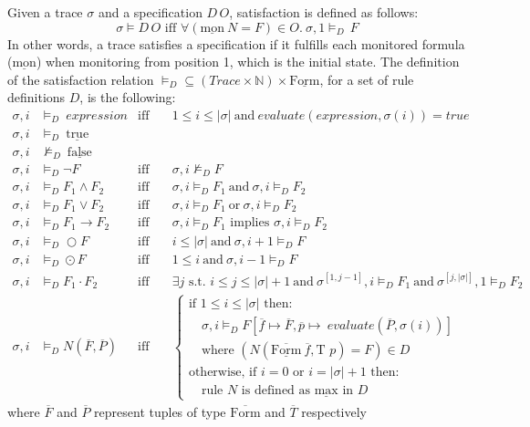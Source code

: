 \documentclass[english]{article}
\begin{document}
Given a trace $\sigma$ and a specification $D \, O$, satisfaction is defined as follows:
\[
\sigma \models D \, O \text{ iff } \forall (\underline{\text{mon}}\ N = F) \in O.\ \sigma ,1 \models_D \, F
\]
In other words, a trace satisfies a specification if it fulfills each monitored formula ($\underline{\text{mon}}$) when monitoring from position 1, which is the initial state. The definition of the satisfaction relation $\models_D \subseteq (Trace \times \mathbb{N}) \times \underline{\text{Form}}$, for a set of rule definitions $D$, is the following:
\begin{align*}
    \sigma, i &\models_D\ expression &\text{iff} \quad &1 \leq i \leq |\sigma|\ \text{and}\ evaluate(expression, \sigma(i)) = true \\
    \sigma, i &\models_D\ \underline{\text{true}} \\
    \sigma, i &\not\models_D\ \underline{\text{false}} \\
    \sigma, i &\models_D \neg F &\text{iff} \quad &\sigma, i \not\models_D F \\
    \sigma, i &\models_D F_1 \land F_2 &\text{iff} \quad &\sigma, i \models_D F_1\ \text{and}\ \sigma, i \models_D F_2 \\
    \sigma, i &\models_D F_1 \lor F_2 &\text{iff} \quad &\sigma, i \models_D F_1\ \text{or}\ \sigma, i \models_D F_2 \\
    \sigma, i &\models_D F_1 \rightarrow F_2 &\text{iff} \quad &\sigma, i \models_D F_1 \text{ implies } \sigma, i \models_D F_2 \\
    \sigma, i &\models_D \bigcirc F &\text{iff} \quad &i \leq |\sigma|\ \text{and}\ \sigma, i+1 \models_D F \\
    \sigma, i &\models_D \odot F &\text{iff} \quad &1 \leq i\ \text{and}\ \sigma, i-1 \models_D F \\
    \sigma, i &\models_D F_1 \cdot F_2 &\text{iff} \quad &\exists j \text{ s.t. } i \leq j \leq |\sigma|+1\ \text{and}\ \sigma^{[1, j-1]}, i \models_D F_1\ \text{and}\ \sigma^{[j,|\sigma|]}, 1 \models_D F_2 \\
    \sigma, i &\models_D N(\overline{F}, \overline{P}) &\text{iff} 
    &\begin{cases}
    \text{if } 1 \leq i \leq |\sigma| \text{ then:} \\
    \quad \sigma, i \models_D F[ \overline{f} \mapsto \overline{F}, \overline{p} \mapsto\ evaluate(\overline{P}, \sigma(i))] \\
    \quad \text{where } (N(\underline{\overline{\text{Form}}}\ \overline{f}, \text{T } p) = F) \in D \\
    \text{otherwise, if } i = 0 \text{ or } i = |\sigma|+1 \text{ then:} \\
    \quad \text{rule } N \text{ is defined as }\underline{\text{max}}\text{ in } D
    \end{cases}
\end{align*}
where $\overline{F}$ and $\overline{P}$ represent tuples of type $\overline{\text{Form}}$ and $\overline{T}$ respectively
    
\end{document}
